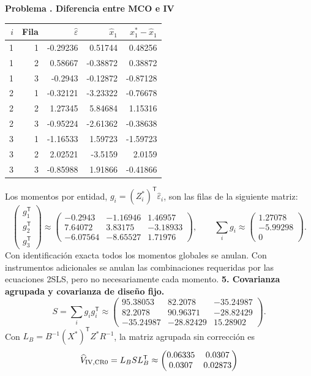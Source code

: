 \documentclass[11pt,a4paper]{article}
\newcommand{\T}{^{\mathsf T}}
\theoremstyle{definition}
\newcounter{problema}
\newenvironment{resuelto}[1]{\refstepcounter{problema}\par\medskip\Needspace{6\baselineskip}\textbf{Problema \theproblema. #1}\par}{\par\medskip}
\newcommand{\eps}{\varepsilon}
\begin{document}
\begin{resuelto}{Diferencia entre MCO e IV}
\begin{center}\small
\begin{tabular}{rrrrr}
\toprule
$i$&Fila&$\widehat\eps$&$\widehat x_1$&$x_1^*-\widehat x_1$\\
\midrule
1&1&-0.29236&0.51744&0.48256\\
1&2&0.58667&-0.38872&0.38872\\
1&3&-0.2943&-0.12872&-0.87128\\
2&1&-0.32121&-3.23322&-0.76678\\
2&2&1.27345&5.84684&1.15316\\
2&3&-0.95224&-2.61362&-0.38638\\
3&1&-1.16533&1.59723&-1.59723\\
3&2&2.02521&-3.5159&2.0159\\
3&3&-0.85988&1.91866&-0.41866\\
\bottomrule
\end{tabular}
\end{center}
Los momentos por entidad, $g_i=(Z_i^*)\T\widehat\eps_i$, son las filas de la siguiente matriz:
\[
\begin{pmatrix}g_1\T\\g_2\T\\g_3\T\end{pmatrix}\approx\begin{pmatrix}
-0.2943&-1.16946&1.46957\\7.64072&3.83175&-3.18933\\-6.07564&-8.65527&1.71976
\end{pmatrix},\qquad \sum_i g_i\approx\begin{pmatrix}
1.27078\\-5.99298\\0
\end{pmatrix}.
\]
Con identificación exacta todos los momentos globales se anulan. Con instrumentos adicionales se anulan las combinaciones requeridas por las ecuaciones 2SLS, pero no necesariamente cada momento.
\textbf{5. Covarianza agrupada y covarianza de diseño fijo.}
\[
S=\sum_i g_ig_i\T\approx\begin{pmatrix}
95.38053&82.2078&-35.24987\\82.2078&90.96371&-28.82429\\-35.24987&-28.82429&15.28902
\end{pmatrix}.
\]
Con $L_B=B^{-1}(X^*)\T Z^*R^{-1}$, la matriz agrupada sin corrección es
\[
\widehat V_{\rm IV,CR0}=L_BSL_B\T\approx\begin{pmatrix}
0.06335&0.0307\\0.0307&0.02873

\end{pmatrix}\]
\end{resuelto}
\end{document}
